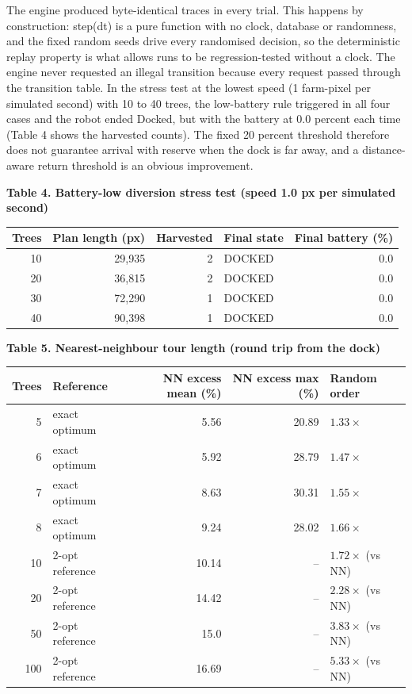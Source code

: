 \documentclass[10pt,a4paper]{article}
\newcommand{\irjsub}[1]{\par\vspace{4pt}\noindent{\cambria\bfseries\fontsize{10}{12}\selectfont #1}\par\vspace{2pt}}
\newcommand{\tablecap}[1]{\par\vspace{6pt}\begin{center}{\cambria\bfseries\fontsize{10}{12}\selectfont #1}\end{center}\vspace{-2pt}}
\begin{document}
The engine produced byte-identical traces in every trial. This happens by construction: step(dt) is a pure function with no clock, database or randomness, and the fixed random seeds drive every randomised decision, so the deterministic replay property is what allows runs to be regression-tested without a clock. The engine never requested an illegal transition because every request passed through the transition table. In the stress test at the lowest speed (1 farm-pixel per simulated second) with 10 to 40 trees, the low-battery rule triggered in all four cases and the robot ended Docked, but with the battery at 0.0 percent each time (Table 4 shows the harvested counts). The fixed 20 percent threshold therefore does not guarantee arrival with reserve when the dock is far away, and a distance-aware return threshold is an obvious improvement.

\begin{table}[!ht]
\vspace{-2pt}
\tablecap{Table 4. Battery-low diversion stress test (speed 1.0 px per simulated second)}

\centering
\small
\begin{tabular}{|r|r|r|l|r|}
\hline
\textbf{Trees} & \textbf{Plan length (px)} & \textbf{Harvested} & \textbf{Final state} & \textbf{Final battery (\%)} \\
\hline
10 & 29,935 & 2 & DOCKED & 0.0 \\
\hline
20 & 36,815 & 2 & DOCKED & 0.0 \\
\hline
30 & 72,290 & 1 & DOCKED & 0.0 \\
\hline
40 & 90,398 & 1 & DOCKED & 0.0 \\
\hline
\end{tabular}
\end{table}

\irjsub{D. Routing quality}

\begin{table}[!ht]
\vspace{-2pt}
\tablecap{Table 5. Nearest-neighbour tour length (round trip from the dock)}

\centering
\small
\begin{tabular}{|r|l|r|r|l|}
\hline
\textbf{Trees} & \textbf{Reference} & \textbf{NN excess mean (\%)} & \textbf{NN excess max (\%)} & \textbf{Random order} \\
\hline
5 & exact optimum & 5.56 & 20.89 & $1.33\times$ \\
\hline
6 & exact optimum & 5.92 & 28.79 & $1.47\times$ \\
\hline
7 & exact optimum & 8.63 & 30.31 & $1.55\times$ \\
\hline
8 & exact optimum & 9.24 & 28.02 & $1.66\times$ \\
\hline
10 & 2-opt reference & 10.14 & -- & $1.72\times$ (vs NN) \\
\hline
20 & 2-opt reference & 14.42 & -- & $2.28\times$ (vs NN) \\
\hline
50 & 2-opt reference & 15.0 & -- & $3.83\times$ (vs NN) \\
\hline
100 & 2-opt reference & 16.69 & -- & $5.33\times$ (vs NN) \\
\hline
\end{tabular}
\end{table}
\end{document}
